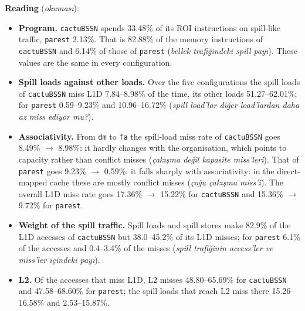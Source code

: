 \documentclass[10pt,a4paper]{article}
\newcommand{\ct}[1]{\texttt{#1}}
\newcommand{\trgloss}[1]{(\textit{#1})}
\begin{document}
\textbf{Reading} \trgloss{okumas{\i}}:
\begin{itemize}
\setlength{\itemsep}{1pt}\setlength{\topsep}{2pt}
\item \textbf{Program.} \ct{cactuBSSN} spends 33.48\% of its ROI instructions on spill-like traffic, \ct{parest} 2.13\%. That is 82.88\% of the memory instructions of \ct{cactuBSSN} and 6.14\% of those of \ct{parest} (\textit{bellek trafi\u{g}indeki spill pay{\i}}). These values are the same in every configuration.
\item \textbf{Spill loads against other loads.} Over the five configurations the spill loads of \ct{cactuBSSN} miss L1D 7.84--8.98\% of the time, its other loads 51.27--62.01\%; for \ct{parest} 0.59--9.23\% and 10.96--16.72\% (\textit{spill load'lar di\u{g}er load'lardan daha az miss ediyor mu?}).
\item \textbf{Associativity.} From \ct{dm} to \ct{fa} the spill-load miss rate of \ct{cactuBSSN} goes 8.49\% $\to$ 8.98\%: it hardly changes with the organisation, which points to capacity rather than conflict misses (\textit{\c{c}ak{\i}\c{s}ma de\u{g}il kapasite miss'leri}). That of \ct{parest} goes 9.23\% $\to$ 0.59\%: it falls sharply with associativity: in the direct-mapped cache these are mostly conflict misses (\textit{\c{c}o\u{g}u \c{c}ak{\i}\c{s}ma miss'i}). The overall L1D miss rate goes 17.36\% $\to$ 15.22\% for \ct{cactuBSSN} and 15.36\% $\to$ 9.72\% for \ct{parest}.
\item \textbf{Weight of the spill traffic.} Spill loads and spill stores make 82.9\% of the L1D accesses of \ct{cactuBSSN} but 38.0--45.2\% of its L1D misses; for \ct{parest} 6.1\% of the accesses and 0.4--3.4\% of the misses (\textit{spill trafi\u{g}inin access'ler ve miss'ler i\c{c}indeki pay{\i}}).
\item \textbf{L2.} Of the accesses that miss L1D, L2 misses 48.80--65.69\% for \ct{cactuBSSN} and 47.58--68.60\% for \ct{parest}; the spill loads that reach L2 miss there 15.26--16.58\% and 2.53--15.87\%.
\end{itemize}
\end{document}
